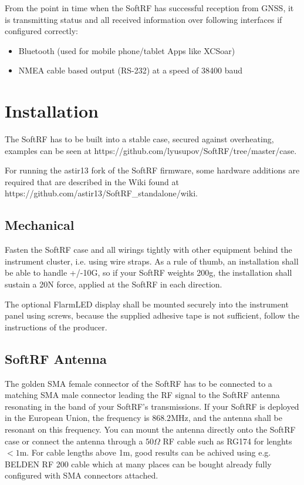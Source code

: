 \documentclass[10pt,a4paper]{article}
\begin{document}
From the point in time when the SoftRF has successful reception from GNSS, it is transmitting status and all received information over following interfaces if configured correctly:
\begin{itemize}
\item Bluetooth (used for mobile phone/tablet Apps like XCSoar)
\item NMEA cable based output (RS-232) at a speed of 38400 baud
\end{itemize}

\section{Installation}
The SoftRF has to be built into a stable case, secured against overheating, examples can be seen at https://github.com/lyusupov/SoftRF/tree/master/case.

For running the astir13 fork of the SoftRF firmware, some hardware additions are required that are described in the Wiki found at https://github.com/astir13/SoftRF\_standalone/wiki.

\subsection{Mechanical}
Fasten the SoftRF case and all wirings tightly with other equipment behind the instrument cluster, i.e. using wire straps. As a rule of thumb, an installation shall be able to handle +/-10G, so if your SoftRF weights 200g, the installation shall sustain a 20N force, applied at the SoftRF in each direction.

The optional FlarmLED display shall be mounted securely into the instrument panel using screws, because the supplied adhesive tape is not sufficient, follow the instructions of the producer.

\begin{center}
\end{center}

\subsection{SoftRF Antenna}
The golden SMA female connector of the SoftRF has to be connected to a matching SMA male connector leading the RF signal to the SoftRF antenna resonating in the band of your SoftRF's transmissions. If your SoftRF is deployed in the European Union, the frequency is $868.2$MHz, and the antenna shall be resonant on this frequency. You can mount the antenna directly onto the SoftRF case or connect the antenna through a $50 \Omega$ RF cable such as RG174 for lenghts $< 1$m. For cable lengths above 1m, good results can be achived using e.g. BELDEN RF 200 cable which at many places can be bought already fully configured with SMA connectors attached.
\end{document}
